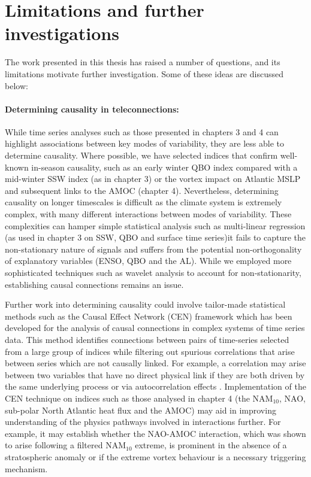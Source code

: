 \section{Limitations and further investigations}
\label{sec:limitations}
The work presented in this thesis has raised a number of questions, and its limitations motivate further investigation. Some of these ideas are discussed below:

\paragraph{Determining causality in teleconnections:}
While time series analyses such as those presented in chapters 3 and 4 can highlight associations between key modes of variability, they are less able to determine causality. Where possible, we have selected indices that confirm well-known in-season causality, such as an early winter QBO index compared with a mid-winter SSW index (as in chapter 3) or the vortex impact on Atlantic MSLP and subsequent links to the AMOC (chapter 4). Nevertheless, determining causality on longer timescales is difficult as the climate system is extremely complex, with many different interactions between modes of variability. These complexities can hamper simple statistical analysis such as multi-linear regression (as used in chapter 3 on SSW, QBO and surface time series)it fails to capture the non-stationary nature of signals and suffers from the potential non-orthogonality of explanatory variables (ENSO, QBO and the AL). While we employed more sophisticated techniques such as wavelet analysis to account for non-stationarity, establishing causal connections remains an issue.

Further work into determining causality could involve tailor-made statistical methods such as the Causal Effect Network (CEN) framework \citep{Kretschmer2016} which has been developed for the analysis of causal connections in complex systems of time series data. This method identifies connections between pairs of time-series selected from a large group of indices while filtering out spurious correlations that arise between series which are not causally linked. For example, a correlation may arise between two variables that have no direct physical link if they are both driven by the same underlying process or via autocorrelation effects \citep{rungeQuantifying2014}. Implementation of the CEN technique on indices such as those analysed in chapter 4 (the NAM$_{10}$, NAO, sub-polar North Atlantic heat flux and the AMOC) may aid in improving understanding of the physics pathways involved in interactions further. For example, it may establish whether the NAO-AMOC interaction, which was shown to arise following a filtered NAM$_{10}$ extreme, is prominent in the absence of a stratospheric anomaly or if the extreme vortex behaviour is a necessary triggering mechanism. 

